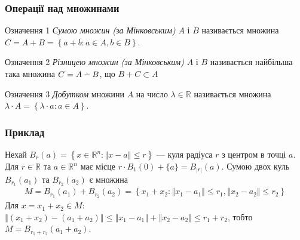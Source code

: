 \documentclass[10pt,pdf]{beamer}
\newcommand{\R}{\mathbb{R}}
\renewcommand{\l}{\left}
\renewcommand{\r}{\right}
\newcommand{\norm}[1]{\left\Vert #1 \right\Vert}
\def\setdif{\mathbin{\ooalign{\hss\raise1ex\hbox{.}\hss\cr
  \mathsurround=0pt$-$}}}
\begin{document}
    \begin{frame}
        \frametitle{Операції над множинами}
    
        \begin{block}{Означення 1}
            \emph{Сумою множин (за Мінковським)} $A$ і $B$ називається множина
            $C = A + B = \l\{ a + b : a \in A, b \in B\r\}$.
        \end{block}

        \begin{block}{Означення 2}
            \emph{Різницею множин (за Мінковським)} $A$ і $B$ називається найбільша така множина
            $C = A \setdif B$, що $B + C \subset A$
        \end{block}

        \begin{block}{Означення 3}
            \emph{Добутком} множини $A$ на число $\lambda \in \R$ називається множина
            $\lambda \cdot A = \l\{\lambda \cdot a : a \in A \r\}$.
        \end{block}
    \end{frame}
    \begin{frame}
        \frametitle{Приклад}
    
        Нехай $B_{r}(a) = \l\{x \in \R^n : \norm{x - a} \leq r \r\}$ --- куля
        радіуса $r$ з центром в точці $a$. Для
        $r \in \R$ та $a \in \R^n$ має місце
        $r\cdot B_{1}(0) + \{a\} = B_{|r|}(a)$.
        Сумою двох куль $B_{r_1}(a_1)$ та $B_{r_2}(a_2)$ є множина
        \begin{gather*}
            M = B_{r_1}(a_1) + B_{r_2}(a_2) = \l\{ 
                x_1 + x_2 : \norm{x_1 - a_1} \leq r_1, \norm{x_2 - a_2} \leq r_2    
            \r\}
        \end{gather*}
        Для $x = x_1 + x_2 \in M$: $\norm{(x_1 + x_2) - (a_1 + a_2)} \leq \norm{x_1 - a_1} + \norm{x_2 - a_2} \leq r_1 + r_2$,
        тобто $M = B_{r_1 + r_2}(a_1 + a_2)$.
        \begin{center}
        \end{center}
    
    \end{frame}
\end{document}
